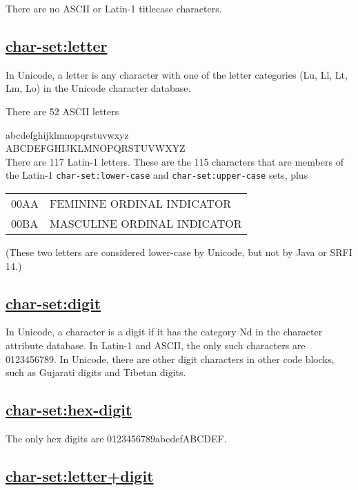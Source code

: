 There are no ASCII or Latin-1 titlecase characters.

\subsection{\texorpdfstring{\href{}{char-set:letter}}{char-set:letter}}\label{char-setletter}

In Unicode, a letter is any character with one of the letter categories
(Lu, Ll, Lt, Lm, Lo) in the Unicode character database.

There are 52 ASCII letters

abcdefghijklmnopqrstuvwxyz\\
ABCDEFGHIJKLMNOPQRSTUVWXYZ\\

There are 117 Latin-1 letters. These are the 115 characters that are
members of the Latin-1 \texttt{char-set:lower-case} and
\texttt{char-set:upper-case} sets, plus

\begin{longtable}[]{@{}ll@{}}
\toprule
00AA & FEMININE ORDINAL INDICATOR\tabularnewline
00BA & MASCULINE ORDINAL INDICATOR\tabularnewline
\bottomrule
\end{longtable}

(These two letters are considered lower-case by Unicode, but not by Java
or SRFI 14.)

\subsection{\texorpdfstring{\href{}{char-set:digit}}{char-set:digit}}\label{char-setdigit}

In Unicode, a character is a digit if it has the category Nd in the
character attribute database. In Latin-1 and ASCII, the only such
characters are 0123456789. In Unicode, there are other digit characters
in other code blocks, such as Gujarati digits and Tibetan digits.

\subsection{\texorpdfstring{\href{}{char-set:hex-digit}}{char-set:hex-digit}}\label{char-sethex-digit}

The only hex digits are 0123456789abcdefABCDEF.

\subsection{\texorpdfstring{\href{}{char-set:letter+digit}}{char-set:letter+digit}}\label{char-setletterdigit}

